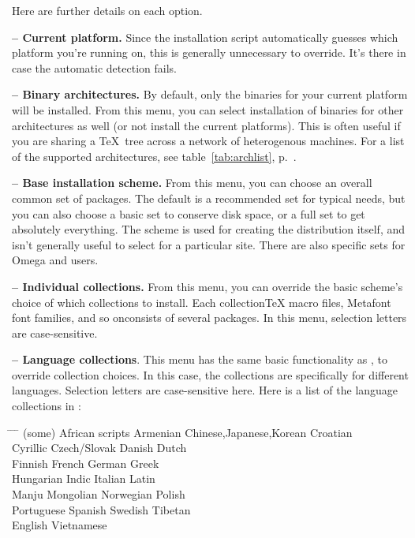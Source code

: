 \documentclass{article}
\begin{document}
Here are further details on each option.

\textbf{ -- Current platform.}  Since the installation script
automatically guesses which platform you're running on, this is
generally unnecessary to override.  It's there in case the automatic
detection fails.

\textbf{ -- Binary architectures.}  By default, only the
binaries for your current platform will be installed.  From this menu,
you can select installation of binaries for other architectures as well
(or not install the current platforms).  This is often useful if you
are sharing a \TeX\ tree across a network of heterogenous machines.  For
a list of the supported architectures, see table~\ref{tab:archlist},
p.~\pageref{tab:archlist}.

\textbf{ -- Base installation scheme.}  From this menu, you
can choose an overall common set of packages.  The default is a
recommended set for typical needs, but you can also choose a basic set
to conserve disk space, or a full set to get absolutely everything.  The
 scheme is used for creating the \TeXLive{}
 distribution itself, and isn't generally useful to select
for a particular site.  There are also specific sets for Omega and
 users.

\textbf{ -- Individual collections.}  From this menu, you can
override the basic scheme's choice of which collections to install.
Each collection\Dash TeX macro files, Metafont font families, and so
on\Dash consists of several packages.  In this menu, selection letters
are case-sensitive.

\textbf{ -- Language collections}.  This menu has the same
basic functionality as , to override collection choices.  In
this case, the collections are specifically for different languages.
Selection letters are case-sensitive here.  Here is a list of the
language collections in \TeXLive:

\begin{tabbing}
\hspace{.25\linewidth} \=
\hspace{.25\linewidth} \=
\hspace{.25\linewidth} \=
\hspace{.25\linewidth} \kill
  (some) African scripts \>
  Armenian \>
  Chinese,Japanese,Korean \>
Croatian \\
  Cyrillic \>
  Czech/Slovak \>
  Danish \>
Dutch \\
  Finnish \>
  French \>
  German \>
Greek \\
  Hungarian \>
  Indic \>
  Italian \>
Latin \\
  Manju \>
  Mongolian \>
  Norwegian \>
Polish \\
  Portuguese \>
  Spanish \>
  Swedish \>
Tibetan \\
   English \>
Vietnamese \\
\end{tabbing}
\end{document}

